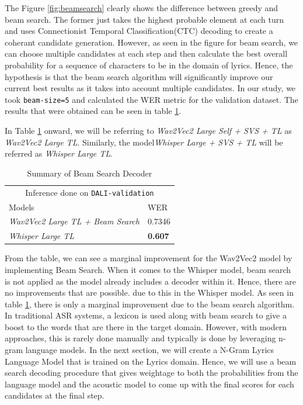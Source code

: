 The Figure \ref{fig:beamsearch} clearly shows the difference between greedy and beam search. The former just takes the highest probable element at each turn and uses Connectionist Temporal Classification(CTC) decoding to create a coherant candidate generation. However, as seen in the figure for beam search, we can choose multiple candidates at each step and then calculate the best overall probability for a sequence of characters to be in the domain of lyrics. Hence, the hypothesis is that the beam search algorithm will significantly improve our current best results as it takes into account multiple candidates. In our study, we took \texttt{beam-size=5} and calculated the WER metric for the validation dataset. The results that were obtained can be seen in table \ref{beamsearch-table}.

In Table \ref{beamsearch-table} onward, we will be referring to \textit{Wav2Vec2 Large Self + SVS + TL} as \textit{Wav2Vec2 Large TL}. Similarly, the model\textit{Whisper Large + SVS + TL} will be referred as \textit{Whisper Large TL}. \\

\renewcommand{\arraystretch}{2}
\setlength{\arrayrulewidth}{0.3mm}
\begin{table}[H]
\small
\begin{center}
\begin{tabular}{ |p{7cm}| p{3cm}| }
\multicolumn{2}{c}{Inference done on \texttt{DALI-validation}} \\
\cline{1-2}
 Models     & WER  \\
\hline  \hline
 \textit{Wav2Vec2 Large TL + Beam Search}   &  0.7346  \\
 \textit{Whisper Large TL}  &  \textbf{0.607}  \\
\hline  \hline
\end{tabular}
\caption{\label{beamsearch-table} Summary of Beam Search Decoder}
\end{center}
\end{table}



From the table, we can see a marginal improvement for the Wav2Vec2 model by implementing Beam Search. When it comes to the Whisper model, beam search is not applied as the model already includes a decoder within it. Hence, there are no improvements that are possible. due to this in the Whisper model. As seen in table \ref{beamsearch-table}, there is only a marginal improvement due to the beam search algorithm. In traditional ASR systems, a lexicon is used along with beam search to give a boost to the words that are there in the target domain. However, with modern approaches, this is rarely done manually and typically is done by leveraging n-gram language models. In the next section, we will create a N-Gram Lyrics Language Model that is trained on the Lyrics domain. Hence, we will use a beam search decoding procedure that gives weightage to both the probabilities from the language model and the acoustic model to come up with the final scores for each candidates at the final step.


